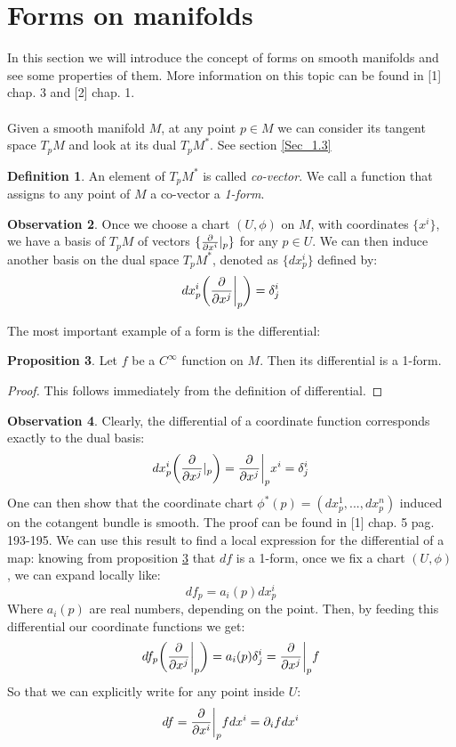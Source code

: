 \documentclass[12pt,a4paper]{report}
\theoremstyle{definition}
\newtheorem{Def}{Definition}[chapter]
\theoremstyle{Theorem}
\newtheorem{Prop}[Def]{Proposition}
\theoremstyle{definition}
\theoremstyle{definition}
\newtheorem{Obs}[Def]{Observation}
\begin{document}
	\section{Forms on manifolds}
	In this section we will introduce the concept of forms on smooth manifolds and see some properties of them. More information on this topic can be found in [1] chap. 3 and [2] chap. 1.\\
	\\
	Given a smooth manifold $M$, at any point $p\in M$ we can consider its tangent space $T_pM$ and look at its dual $T_pM^*$. See section \ref{Sec_1.3} 
	\begin{Def}
		An element of $T_pM^*$ is called \textit{co-vector}. We call a function that assigns to any point of $M$ a co-vector a \textit{1-form}.
	\end{Def}
	\begin{Obs}
		Once we choose a chart $(U,\phi)$ on $M$, with coordinates $\{x^i\}$, we have a basis of $T_pM$ of vectors $\{{\partial\over \partial x^i}|_p\}$ for any $p\in U$. We can then induce another basis on the dual space $T_pM^*$, denoted as $\{dx^i_p\}$ defined by:
		$$dx^i_p\bigg({\partial\over \partial x^j}\bigg|_p\bigg)=\delta^i_j$$
	\end{Obs}
	\begin{comment}
		\begin{Obs}
			Note that on a metric manifold $(M,g)$, after choosing a chart, we can expand the metric tensor in local coordinates:
			$$g=g_{ij}dx^i\otimes dx^j$$  
		\end{Obs}
	\end{comment}
	The most important example of a form is the differential:
	\begin{Prop} \label{df_is_a_form}
		Let $f$ be a $C^\infty$ function on $M$. Then its differential is a 1-form.
	\end{Prop}
	\begin{proof}
		This follows immediately from the definition of differential.
	\end{proof}
	\begin{Obs}
		Clearly, the differential of a coordinate function corresponds exactly to the dual basis:
		$$dx^i_p\bigg({\partial\over \partial x^j}|_p\bigg)={\partial\over \partial x^j}\bigg|_px^i=\delta^i_j$$
		One can then show that the coordinate chart $\phi^*(p)=(dx^1_p,...,dx^n_p)$ induced on the cotangent bundle is smooth. The proof can be found in [1] chap. 5 pag. 193-195.
		We can use this result to find a local expression for the differential of a map:
		knowing from proposition \ref{df_is_a_form} that $df$ is a 1-form, once we fix a chart $(U,\phi)$, we can expand locally like:
		$$df_p=a_i(p)dx^i_p$$
		Where $a_i(p)$ are real numbers, depending on the point.
		Then, by feeding this differential our coordinate functions we get:
		$$df_p\bigg({\partial\over \partial x^j}\bigg|_p\bigg)=a_i(p)\delta^i_j={\partial\over \partial x^j}\bigg|_pf$$
		So that we can explicitly write for any point inside $U$:
		$$df={\partial\over \partial x^i}\bigg|_pfdx^i=\partial_ifdx^i$$
	\end{Obs}
\end{document}

